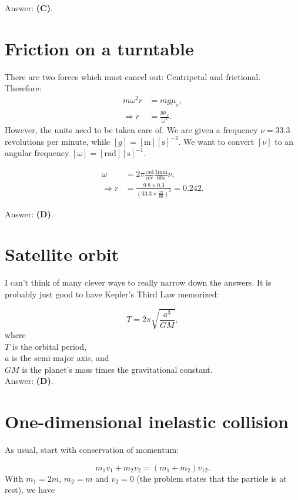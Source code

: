 \documentclass[11pt]{paper}
\newcommand{\answer}[1]{Answer: \textbf{(#1)}.}
\begin{document}
\answer{C}

\section{Friction on a turntable}
There are two forces which must cancel out:  Centripetal and frictional.\\
Therefore:
\begin{align}
m \omega^2 r &= m g \mu_s,\\
\Rightarrow r &= \frac{g \mu_s}{\omega^2}.
\end{align}
However, the units need to be taken care of.  We are given a frequency $\nu = 33.3$ revolutions per minute, while $[g] = [\text{m}][\text{s}]^{-2}$.  We want to convert $[\nu]$ to an angular frequency $[\omega] = [\text{rad}][\text{s}]^{-1}$.

\begin{align}
\omega &= 2 \pi \frac{\text{rad}}{\text{rev}} \frac{1 \text{min}}{60 \text{s}} \nu,\\
\Rightarrow r &= \frac{9.8 \times 0.3}{\left(33.3 \times \frac{2 \pi}{60} \right)^2} = 0.242.
\end{align}

\answer{D}

\section{Satellite orbit}
I can't think of many clever ways to really narrow down the answers.  It is probably just good to have Kepler's Third Law memorized:

\begin{equation}
T = 2\pi \sqrt{\frac{a^3}{GM}},
\end{equation}
where\\
$T$ is the orbital period,\\
$a$ is the semi-major axis, and\\
$GM$ is the planet's mass times the gravitational constant.\\

\answer{D}

\section{One-dimensional inelastic collision}
As usual, start with conservation of momentum:

\begin{equation}
m_1 v_1 + m_2 v_2 = (m_1 + m_2) v_{12}.
\end{equation}
With $m_1 = 2m$, $m_2 = m$ and $v_2 = 0$ (the problem states that the particle is at rest), we have
\end{document}
